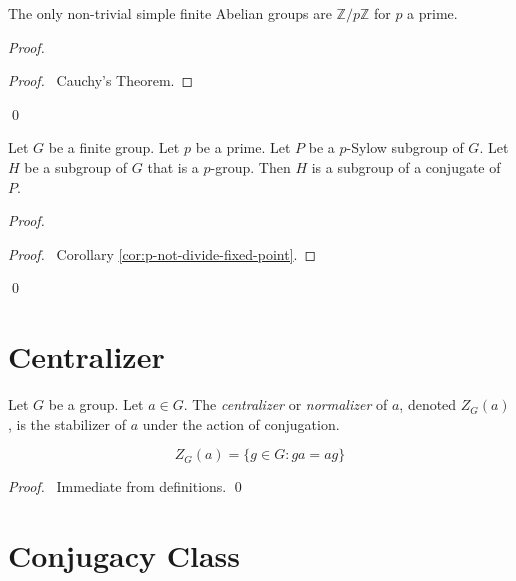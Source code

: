 \begin{prop}
The only non-trivial simple finite Abelian groups are $\mathbb{Z} / p \mathbb{Z}$ for $p$ a prime.
\end{prop}

\begin{proof}
\pf
{}
\begin{proof}
	\pf\ Cauchy's Theorem.
\end{proof}
\qed
\end{proof}

\begin{thm}
Let $G$ be a finite group. Let $p$ be a prime. Let $P$ be a $p$-Sylow subgroup of $G$. Let $H$ be a subgroup of $G$ that is a $p$-group. Then $H$ is a subgroup of a conjugate of $P$.
\end{thm}

\begin{proof}
\pf
{}
\begin{proof}
	\pf\ Corollary \ref{cor:p-not-divide-fixed-point}.
\end{proof}
\qed
\end{proof}

\section{Centralizer}

\begin{df}[Centralizer]
Let $G$ be a group. Let $a \in G$. The \emph{centralizer} or \emph{normalizer} of $a$, denoted $Z_G(a)$, is the stabilizer of $a$ under the action of conjugation.
\end{df}

\begin{prop}
\[ Z_G(a) = \{ g \in G : ga = ag \} \]
\end{prop}

\begin{proof}
\pf\ Immediate from definitions. \qed
\end{proof}

\section{Conjugacy Class}

